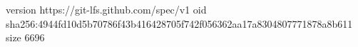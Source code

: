 version https://git-lfs.github.com/spec/v1
oid sha256:4944fd10d5b70786f43b416428705f742f056362aa17a8304807771878a8b611
size 6696

